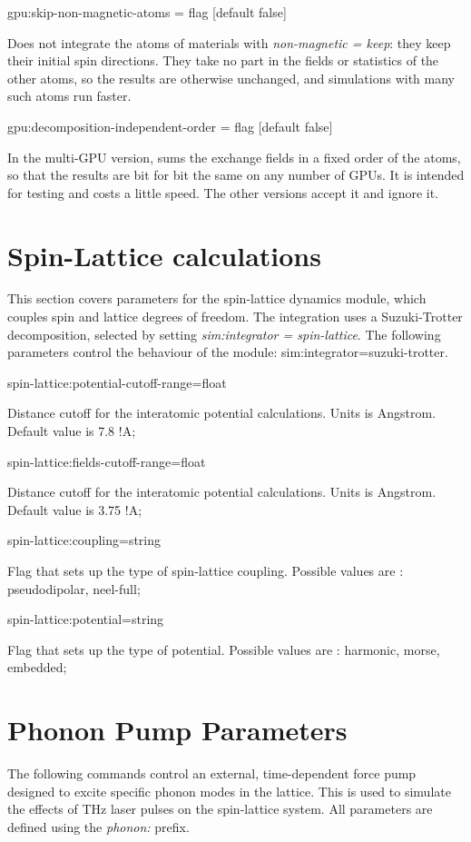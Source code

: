 {\zicf gpu:skip-non-magnetic-atoms = flag [default false]} Does not integrate the atoms of materials with \textit{non-magnetic = keep}: they keep their initial spin directions. They take no part in the fields or statistics of the other atoms, so the results are otherwise unchanged, and simulations with many such atoms run faster.

{\zicf gpu:decomposition-independent-order = flag [default false]} In the multi-GPU version, sums the exchange fields in a fixed order of the atoms, so that the results are bit for bit the same on any number of GPUs. It is intended for testing and costs a little speed. The other versions accept it and ignore it.

\section*{Spin-Lattice calculations}
This section covers parameters for the spin-lattice dynamics module, which couples spin and lattice degrees of freedom. The integration uses a Suzuki-Trotter decomposition, selected by setting \textit{sim:integrator = spin-lattice}. The following parameters control the behaviour of the module:
sim:integrator=suzuki-trotter.

{\zicf spin-lattice:potential-cutoff-range=float}
Distance cutoff for the interatomic potential calculations. Units is Angstrom.  Default value is 7.8 !A;

{\zicf spin-lattice:fields-cutoff-range=float}
Distance cutoff for the interatomic potential calculations. Units is Angstrom.  Default value is 3.75 !A;

{\zicf spin-lattice:coupling=string}
 Flag that sets up the type of spin-lattice coupling. Possible values are : pseudodipolar, {neel-full};

 {\zicf spin-lattice:potential=string}
 Flag that sets up the type of potential. Possible values are : harmonic, morse, embedded;


\section*{Phonon Pump Parameters}
The following commands control an external, time-dependent force pump designed to excite specific phonon modes in the lattice. This is used to simulate the effects of THz laser pulses on the spin-lattice system. All parameters are defined using the \textit{phonon:} prefix.

